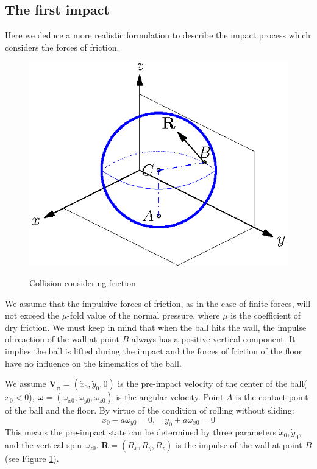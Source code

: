 \documentclass[preprint,12pt]{elsarticle}
\renewcommand{\vec}[1]{\boldsymbol{#1}}
\begin{document}
\subsection{The first impact}
Here we deduce a more realistic formulation to describe the impact process which considers the forces of friction.

\begin{figure}
  \centering
  \includegraphics[scale=1]{mysecond.eps}\\
  \caption{Collision considering friction}\label{figure:collision}
\end{figure}


We assume that the impulsive forces of friction, as in the case of finite forces, will not exceed the $\mu$-fold value of the normal pressure, where $\mu$ is the coefficient of dry friction.
We must keep in mind that when the ball hits the wall, the impulse of reaction of the wall at point $B$ always has a positive vertical component.
It implies the ball is lifted during the impact and the forces of friction of the floor have no influence on the kinematics of the ball\cite{Neimark}.

We assume $\vec{V_{_C}}=(\dot{x}_0,\dot{y}_0,0)$ is the pre-impact velocity of the center of the ball($\dot{x}_0<0$), $\vec{\omega}=(\omega_{x0},\omega_{y0},\omega_{z0})$ is the angular velocity.
Point $A$ is the contact point of the ball and the floor.
By virtue of the condition of rolling without sliding:
\begin{equation}
  \dot{x}_0-a\omega_{y0}=0,\quad \dot{y}_0+a \omega_{x0}=0
\end{equation}
This means the pre-impact state can be determined by three parameters $\dot{x}_0,\dot{y}_0$, and the vertical spin $\omega_{z0}$.
$\vec{R}=(R_x,R_y,R_z)$ is the impulse of the wall at point $B$ (see Figure \ref{figure:collision}).
\end{document}
